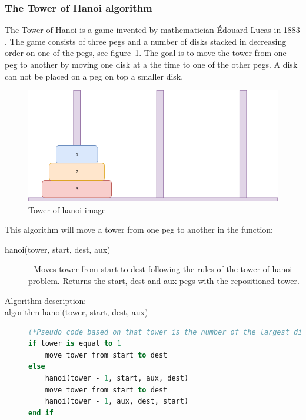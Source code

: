 \documentclass {article}
\begin{document}
\subsubsection{The Tower of Hanoi algorithm}
The Tower of Hanoi is a game invented by mathematician Édouard Lucas in 1883 \cite{hanoi}. The game consists of three pegs and a number of disks stacked in decreasing order on one of the pegs, see figure~\ref{fig:tower-of-hanoi-example}. The goal is to move the tower from one peg to another by moving one disk at a the time to one of the other pegs. A disk can not be placed on a peg on top a smaller disk. 

\begin{figure}[H]
\includegraphics[width=\textwidth]{tower-of-hanoi-example}

\caption{Tower of hanoi image}
\label{fig:tower-of-hanoi-example}
\end{figure}

This algorithm will move a tower from one peg to another in the function:

\begin{description}
\item[hanoi(tower, start, dest, aux)] - Moves tower from start to dest following the rules of the tower of hanoi problem. Returns the start, dest and aux pegs with the repositioned tower.


\item[Algorithm description:]
\item[algorithm hanoi(tower, start, dest, aux)]
\item[] 
\begin{lstlisting}[language=Pascal]
(*Pseudo code based on that tower is the number of the largest disk, where 1 is the smallest disk in the tower.*)
if tower is equal to 1
 	move tower from start to dest
else
 	hanoi(tower - 1, start, aux, dest)
 	move tower from start to dest
 	hanoi(tower - 1, aux, dest, start)
end if
\end{lstlisting}
\end{description}
\end{document}
